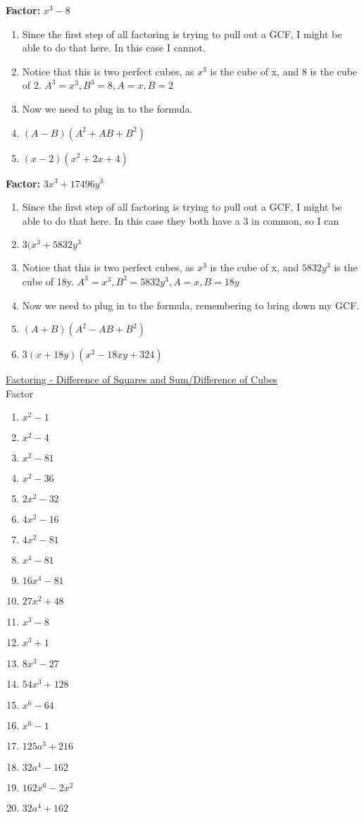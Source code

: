 \documentclass{article}
\begin{document}
\textbf{Factor:} $x^{3} - 8$\\
\begin{enumerate}
\item Since the first step of all factoring is trying to pull out a GCF, I might be able to do that here. In this case I cannot.
\item Notice that this is two perfect cubes, as $x^{3}$ is the cube of x, and 8 is the cube of 2. $A^{3}=x^{3}, B^{3}=8, A=x, B=2$
\item Now we need to plug in to the formula.
\item [] $(A-B)(A^{2}+AB+B^{2})$
\item [] $(x-2)(x^{2}+2x+4)$
\end{enumerate}
\textbf{Factor:} $3x^{3} + 17496y^{3}$\\
\begin{enumerate}
\item Since the first step of all factoring is trying to pull out a GCF, I might be able to do that here. In this case they both have a 3 in common, so I can
\item [] $3(x^{3}+5832y^{3}$
\item Notice that this is two perfect cubes, as $x^{3}$ is the cube of x, and $5832y^{3}$ is the cube of 18y. $A^{3}=x^{3}, B^{3}=5832y^{3}, A=x, B=18y$
\item Now we need to plug in to the formula, remembering to bring down my GCF.
\item [] $(A+B)(A^{2}-AB+B^{2})$
\item [] $3(x+18y)(x^{2}-18xy+324)$
\end{enumerate}
\underline{Factoring - Difference of Squares and Sum/Difference of Cubes} \\
Factor\\
\begin{enumerate}
\item $x^{2} - 1$
\item $x^{2} - 4$
\item $x^{2} - 81$
\item $x^{2} - 36$
\item $2x^{2} - 32$
\item $4x^{2} - 16$
\item $4x^{2} - 81$
\item $x^{4} - 81$
\item $16x^{4} - 81$
\item $27x^{2} + 48$
\item $x^{3} - 8$
\item $x^{3} + 1$
\item $8x^{3} - 27$
\item $54x^{3} + 128$
\item $x^{6} - 64$
\item $x^{6} - 1$
\item $125a^{3} + 216$
\item $32a^{4} - 162$
\item $162x^{6} -2x^{2}$
\item $32a^{4} + 162$
\end{enumerate}
\end{document}
